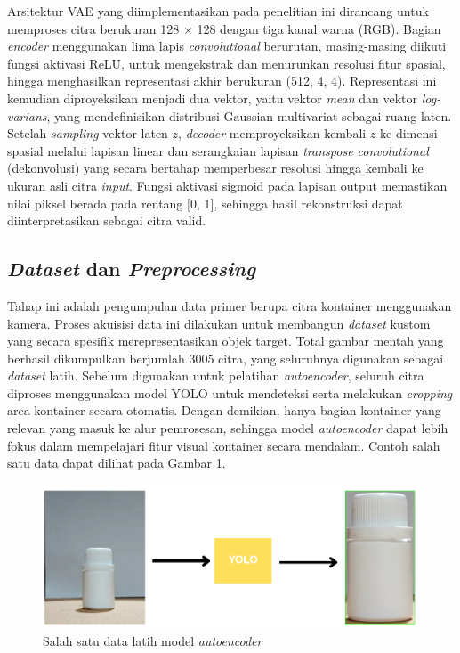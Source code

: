 Arsitektur VAE yang diimplementasikan pada penelitian ini dirancang
untuk memproses citra berukuran 128 $\times$ 128 dengan tiga kanal
warna (RGB). Bagian \textit{encoder} menggunakan lima lapis
\textit{convolutional} berurutan, masing-masing diikuti fungsi
aktivasi ReLU, untuk mengekstrak dan menurunkan
resolusi fitur spasial, hingga menghasilkan representasi akhir
berukuran (512, 4, 4). Representasi ini kemudian diproyeksikan
menjadi dua vektor, yaitu vektor
\textit{mean} dan vektor \textit{log-varians}, yang mendefinisikan
distribusi Gaussian
multivariat sebagai ruang laten. Setelah \textit{sampling} vektor laten $z$,
\textit{decoder} memproyeksikan kembali $z$ ke dimensi spasial melalui lapisan
linear dan serangkaian lapisan \textit{transpose convolutional}
(dekonvolusi) yang secara bertahap memperbesar resolusi hingga
kembali ke ukuran asli citra \textit{input}. Fungsi aktivasi sigmoid pada
lapisan output memastikan nilai piksel berada pada rentang $\text{[0, 1]}$,
sehingga hasil rekonstruksi dapat diinterpretasikan sebagai citra valid.

\vspace{1em}

\subsection{\textit{Dataset} dan \textit{Preprocessing}}
Tahap ini adalah pengumpulan data primer berupa
citra kontainer menggunakan kamera. Proses akuisisi data ini
dilakukan untuk membangun \textit{dataset} kustom yang secara spesifik
merepresentasikan objek target. Total gambar mentah yang berhasil
dikumpulkan berjumlah 3005 citra, yang seluruhnya digunakan sebagai
\textit{dataset} latih. Sebelum digunakan untuk pelatihan
\textit{autoencoder}, seluruh
citra diproses menggunakan model YOLO untuk mendeteksi serta
melakukan \textit{cropping} area kontainer
secara otomatis. Dengan demikian, hanya bagian kontainer yang relevan
yang masuk ke alur pemrosesan, sehingga model \textit{autoencoder} dapat
lebih fokus dalam mempelajari fitur visual kontainer secara mendalam.
Contoh salah satu data dapat dilihat pada Gambar \ref{fig:ae-data}.

\begin{figure}[H]
  \centering
  \includegraphics[width=\textwidth]{gambar/ae_data.png}
  \caption{Salah satu data latih model \textit{autoencoder}}
  \label{fig:ae-data}
\end{figure}
\vspace{-1em}

